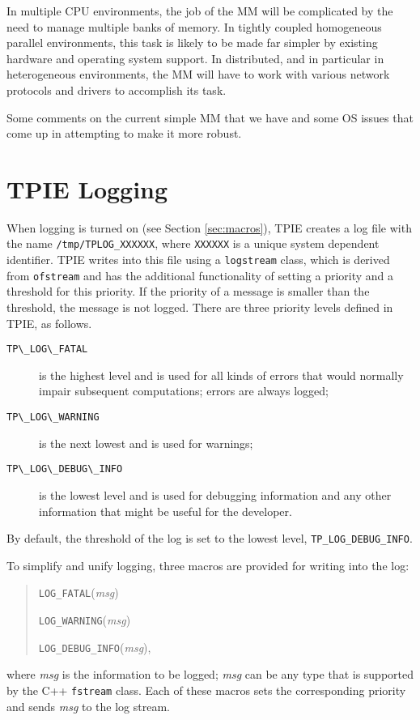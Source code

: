 In multiple CPU environments, the job of the MM will be complicated by
the need to manage multiple banks of memory.  In tightly coupled
homogeneous parallel environments, this task is likely to be made far
simpler by existing hardware and operating system support.  In
distributed, and in particular in heterogeneous environments, the MM
will have to work with various network protocols and drivers to
accomplish its task.

Some comments on the current simple MM that we have and some OS issues
that come up in attempting to make it more robust.

\section{TPIE Logging}
\label{sec:logging}

When logging is turned on (see Section \ref{sec:macros}), TPIE creates a log file with the name \verb|/tmp/TPLOG_XXXXXX|, where \verb|XXXXXX| is a unique system dependent identifier. TPIE writes into this file using a \verb|logstream| class, which is derived from \verb|ofstream| and has the additional functionality of setting a priority and a threshold for this priority. If the priority of a message is smaller than the threshold, the message is not logged. There are three priority levels defined in TPIE, as follows.
\begin{description}
\item[\verb|TP\_LOG\_FATAL|] is the highest level and is used for all kinds of errors that would normally impair subsequent computations; errors are always logged;
\item[\verb|TP\_LOG\_WARNING|] is the next lowest and is used for warnings;
\item[\verb|TP\_LOG\_DEBUG\_INFO|] is the lowest level and is used for debugging information and any other information that might be useful for the developer.
\end{description}
By default, the threshold of the log is set to the lowest level, \verb|TP_LOG_DEBUG_INFO|.

To simplify and unify logging, three macros are provided for writing into the log: 
\begin{quote}
\verb|LOG_FATAL|({\em msg})

\verb|LOG_WARNING|({\em msg})

\verb|LOG_DEBUG_INFO|({\em msg}),
\end{quote}
where {\em msg} is the information to be logged; {\em msg} can be any type that is supported by the C++ \verb|fstream| class. Each of these macros sets the corresponding priority and sends {\em msg} to the log stream.

